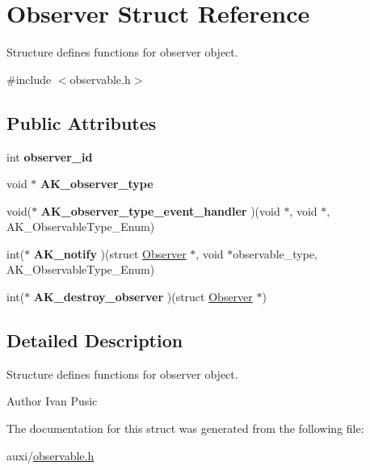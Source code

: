 \hypertarget{structObserver}{}\section{Observer Struct Reference}
\label{structObserver}


Structure defines functions for observer object.  




{\ttfamily \#include $<$observable.\+h$>$}

\subsection*{Public Attributes}
\begin{DoxyCompactItemize}
\item 
\mbox{\label{structObserver_a178bba55a1574a61e0dca9213a0363b3}} 
int {\bfseries observer\+\_\+id}
\item 
\mbox{\label{structObserver_af7cd549aeecfccc865d3c4ebc9aea92d}} 
void $\ast$ {\bfseries A\+K\+\_\+observer\+\_\+type}
\item 
\mbox{\label{structObserver_a8fc5724850853e71ef2488eee1910e5c}} 
void($\ast$ {\bfseries A\+K\+\_\+observer\+\_\+type\+\_\+event\+\_\+handler} )(void $\ast$, void $\ast$, A\+K\+\_\+\+Observable\+Type\+\_\+\+Enum)
\item 
\mbox{\label{structObserver_ad46628733c1fa1bd04395942006c7003}} 
int($\ast$ {\bfseries A\+K\+\_\+notify} )(struct \hyperlink{structObserver}{Observer} $\ast$, void $\ast$observable\+\_\+type, A\+K\+\_\+\+Observable\+Type\+\_\+\+Enum)
\item 
\mbox{\label{structObserver_a16784b3a63311f3eafa19d1190aaef2a}} 
int($\ast$ {\bfseries A\+K\+\_\+destroy\+\_\+observer} )(struct \hyperlink{structObserver}{Observer} $\ast$)
\end{DoxyCompactItemize}


\subsection{Detailed Description}
Structure defines functions for observer object. 

\begin{DoxyAuthor}{Author}
Ivan Pusic 
\end{DoxyAuthor}


The documentation for this struct was generated from the following file\+:\begin{DoxyCompactItemize}
\item 
auxi/\hyperlink{observable_8h}{observable.\+h}\end{DoxyCompactItemize}
